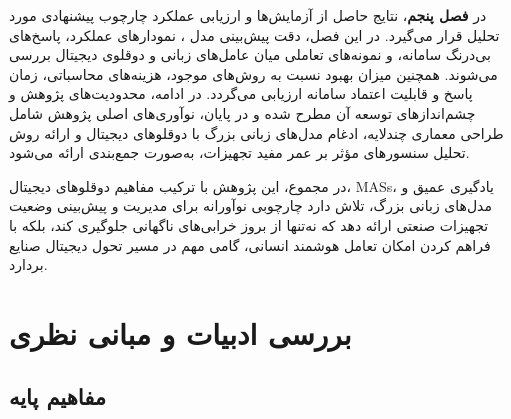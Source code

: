 در \textbf{فصل پنجم}، نتایج حاصل از آزمایش‌ها و ارزیابی عملکرد چارچوب پیشنهادی مورد تحلیل قرار می‌گیرد. در این فصل، دقت پیش‌بینی مدل ، نمودارهای عملکرد، پاسخ‌های بی‌درنگ سامانه، و نمونه‌های تعاملی میان عامل‌های زبانی و دوقلوی دیجیتال بررسی می‌شوند. همچنین میزان بهبود نسبت به روش‌های موجود، هزینه‌های محاسباتی، زمان پاسخ و قابلیت اعتماد سامانه ارزیابی می‌گردد. در ادامه، محدودیت‌های پژوهش و چشم‌اندازهای توسعه آن مطرح شده و در پایان، نوآوری‌های اصلی پژوهش شامل طراحی معماری چندلایه، ادغام مدل‌های زبانی بزرگ با دوقلوهای دیجیتال و ارائه روش تحلیل سنسورهای مؤثر بر عمر مفید تجهیزات، به‌صورت جمع‌بندی ارائه می‌شود.


\noindent
در مجموع، این پژوهش با ترکیب مفاهیم دوقلوهای دیجیتال، \glspl{MAS}، یادگیری عمیق و مدل‌های زبانی بزرگ، تلاش دارد چارچوبی نوآورانه برای مدیریت و پیش‌بینی وضعیت تجهیزات صنعتی ارائه دهد که نه‌تنها از بروز خرابی‌های ناگهانی جلوگیری کند، بلکه با فراهم کردن امکان تعامل هوشمند انسانی، گامی مهم در مسیر تحول دیجیتال صنایع بردارد.


%
%
%
%
%
%
%
%
%


\chapter{بررسی ادبیات و مبانی نظری}\label{chap:review}

\section{مفاهیم پایه}\label{chap:brain}

